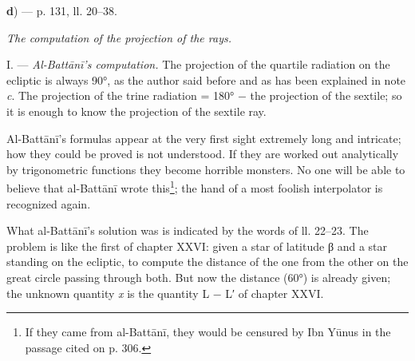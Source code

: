 \documentclass[11pt]{article}
\newcommand{\Pg}[1]{\marginpar{\footnotesize\color{gray}#1}}
\begin{document}
\begin{center}\end{center}
\par\begin{center}\Pg{I 307}\textbf{d}) — p. 131, ll. 20–38.\end{center}
\par \emph{The computation of the projection of the rays.}\par
\par I. — \emph{Al-Battānī's computation.} The projection of the quartile radiation on the ecliptic is always 90°, as the author said before and as has been explained in note \emph{c}. The projection of the trine radiation = 180° − the projection of the sextile; so it is enough to know the projection of the sextile ray.\par
\par Al-Battānī's formulas appear at the very first sight extremely long and intricate; how they could be proved is not understood. If they are worked out analytically by trigonometric functions they become horrible monsters. No one will be able to believe that al-Battānī wrote this\footnote{If they came from al-Battānī, they would be censured by Ibn Yūnus in the passage cited on p. 306.}; the hand of a most foolish interpolator is recognized again.\par
\begin{center}\end{center}
\par What al-Battānī's solution was is indicated by the words of ll. 22–23. The problem is like the first of chapter XXVI: given a star of latitude {\greekfont β} and a star standing on the ecliptic, to compute the distance of the one from the other on the great circle passing through both. But now the distance (60°) is already given; the unknown quantity \emph{x} is the quantity L − L′ of chapter XXVI.\par
\end{document}
